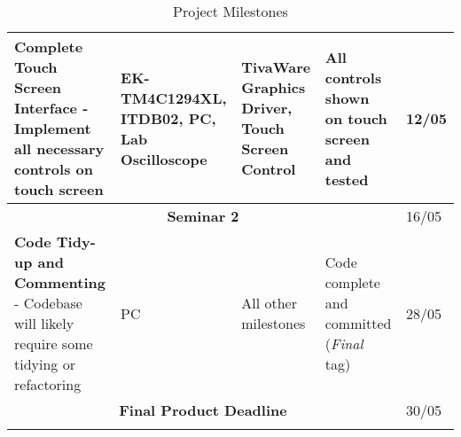 \documentclass[12pt]{report}
\begin{document}
\begin{longtable}{|p{5cm}|p{4cm}|p{2.8cm}|p{2.5cm}|p{1.8cm}|}
	\hline
	\textbf{Complete Touch Screen Interface} - Implement all necessary controls on touch screen &
	EK-TM4C1294XL, ITDB02, PC, Lab Oscilloscope &
	TivaWare Graphics Driver, Touch Screen Control &
	All controls shown on touch screen and tested &
	12/05\\
	
	\hline
	\multicolumn{4}{|c|}{\textbf{Seminar 2}} & 16/05\\
	
	\hline
	\textbf{Code Tidy-up and Commenting} - Codebase will likely require some tidying or refactoring &
	PC &
	All other milestones &
	Code complete and committed (\emph{Final} tag) &
	28/05\\
	
	\hline
	\multicolumn{4}{|c|}{\textbf{Final Product Deadline}} & 30/05\\
	
	\hline
	
	\caption{Project Milestones}
	\label{milestones}
\end{longtable}



\end{document}
